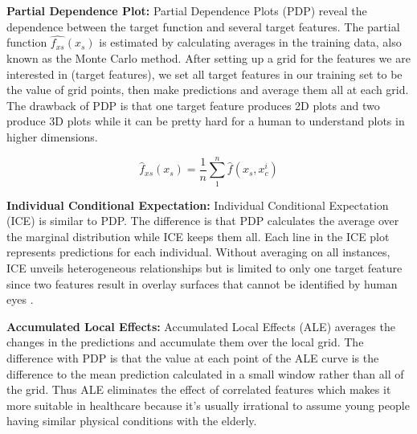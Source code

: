 
\textbf{Partial Dependence Plot: } Partial Dependence Plots (PDP) reveal the dependence between the target function and several target features. The partial function $ \hat{f_{xs}}(x_s) $ is estimated by calculating averages in the training data, also known as the Monte Carlo method. After setting up a grid for the features we are interested in (target features), we set all target features in our training set to be the value of grid points, then make predictions and average them all at each grid. The drawback of PDP is that one target feature produces 2D plots and two produce 3D plots while it can be pretty hard for a human to understand plots in higher dimensions.

\begin{equation}
    \label{eq:1}
    \hat{f}_{xs}(x_s) = \frac{1}{n}\sum_{1}^{n}\hat{f}(x_s, x_c^{i})
\end{equation}

\textbf{Individual Conditional Expectation: } Individual Conditional Expectation (ICE) is similar to PDP. The difference is that PDP calculates the average over the marginal distribution while ICE keeps them all. Each line in the ICE plot represents predictions for each individual. Without averaging on all instances, ICE unveils heterogeneous relationships but is limited to only one target feature since two features result in overlay surfaces that cannot be identified by human eyes \cite{molnar2019}.

\textbf{Accumulated Local Effects: } Accumulated Local Effects (ALE) averages the changes in the predictions and accumulate them over the local grid. The difference with PDP is that the value at each point of the ALE curve is the difference to the mean prediction calculated in a small window rather than all of the grid. Thus ALE eliminates the effect of correlated features \cite{molnar2019} which makes it more suitable in healthcare because it's usually irrational to assume young people having similar physical conditions with the elderly.


